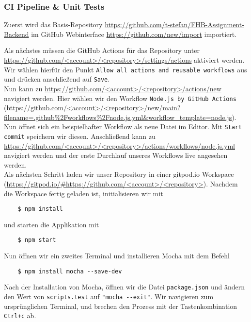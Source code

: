 \subsubsection{CI Pipeline \& Unit Tests}
Zuerst wird das Basis-Repository 
\url{https://github.com/t-stefan/FHB-Assignment-Backend}
im GitHub Webinterface
\url{https://github.com/new/import} 
importiert.

\noindent
Als nächstes müssen die GitHub Actions für das Repository unter
\url{https://github.com/<account>/<repository>/settings/actions}
aktiviert werden.
Wir wählen hierfür den Punkt \verb|Allow all actions and reusable workflows| aus
und drücken anschließend auf \verb|Save|. \\

\noindent
Nun kann zu \url{https://github.com/<account>/<repository>/actions/new}
navigiert werden.
Hier wählen wir den Workflow \verb|Node.js by GitHub Actions| 
(\url{https://github.com/<account>/<repository>/new/main?filename=.github%2Fworkflows%2Fnode.js.yml&workflow_template=node.js}).
Nun öffnet sich ein beispielhafter Workflow als neue Datei im Editor.
Mit \verb|Start commit| speichern wir diesen.
Anschließend kann zu \url{https://github.com/<account>/<repository>/actions/workflows/node.js.yml}
navigiert werden und der erste Durchlauf unseres Workflows live angesehen werden. \\

\noindent
Als nächsten Schritt laden wir unser Repository in einer gitpod.io Workspace
(\url{https://gitpod.io/#https://github.com/<account>/<repository>}).
Nachdem die Workspace fertig geladen ist, initialisieren wir mit 

\begin{verbatim}
	$ npm install
\end{verbatim}

\noindent
und starten die Applikation mit 
\begin{verbatim}
	$ npm start
\end{verbatim}

\noindent
Nun öffnen wir ein zweites Terminal und installieren Mocha
\cite{mochajsorgWebsite} mit dem Befehl

\begin{verbatim}
	$ npm install mocha --save-dev
\end{verbatim}

\noindent
Nach der Installation von Mocha, öffnen wir die Datei \verb|package.json|
und ändern den Wert von \verb|scripts.test| auf \verb|"mocha --exit"|.
Wir navigieren zum ursprünglichen Terminal, und brechen den Prozess mit der
Tastenkombination \verb|Ctrl+c| ab. \\

